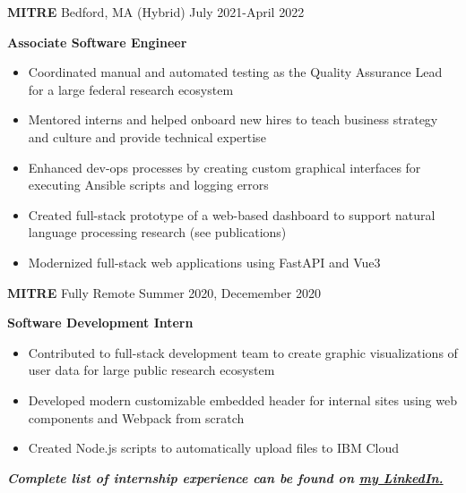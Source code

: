 \documentclass[10pt,a4paper,ragged2e,withhyper]{altacv}
\begin{document}
\begin{paracol}{2}
\large\color{emphasis}\textbf{MITRE} \small\faSuitcase Bedford, MA (Hybrid)
\hfill\small\faCalendar July 2021-April 2022\par
\textbf{\color{subheading}Associate Software Engineer}\par
\smallskip
\normalsize
\begin{itemize}
\item Coordinated manual and automated testing as the Quality Assurance Lead for a large federal research ecosystem
\item Mentored interns and helped onboard new hires to teach business strategy and culture and provide technical expertise
\item Enhanced dev-ops processes by creating custom graphical interfaces for executing Ansible scripts and logging errors
\item Created full-stack prototype of a web-based dashboard to support natural language processing research (see publications)
\item Modernized full-stack web applications using FastAPI and Vue3
\end{itemize}
\divider

\large\color{emphasis}\textbf{MITRE} \small\faDesktop Fully Remote
\hfill\small\faCalendar Summer 2020, Decemember 2020\par
\textbf{\color{subheading}Software Development Intern}\par
\smallskip
\normalsize
\begin{itemize}
\item Contributed to full-stack development team to create graphic visualizations of user data for large public research ecosystem
\item Developed modern customizable embedded header for internal sites using web components and Webpack from scratch
\item Created Node.js scripts to automatically upload files to IBM Cloud
\end{itemize}

\begin{center}
\textbf{\textit{Complete list of internship experience can be found on \href{https://linkedin.com/in/james-d-tanner}{my LinkedIn.}}}
\end{center}




\end{paracol}
\end{document}
